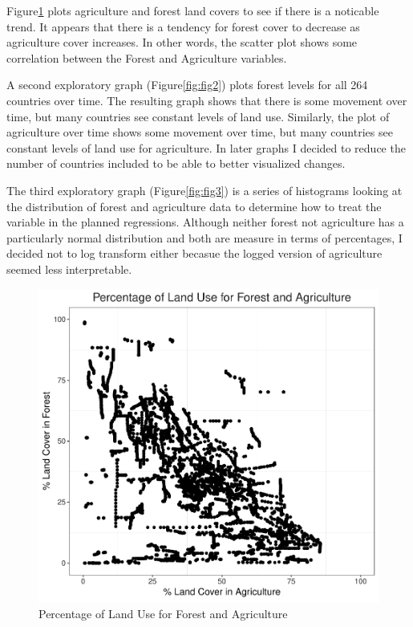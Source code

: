 \documentclass[12pt,]{article}
\begin{document}
Figure\ref{fig:fig1} plots agriculture and forest land covers to see if
there is a noticable trend. It appears that there is a tendency for
forest cover to decrease as agriculture cover increases. In other words,
the scatter plot shows some correlation between the Forest and
Agriculture variables.

A second exploratory graph (Figure\ref{fig:fig2}) plots forest levels
for all 264 countries over time. The resulting graph shows that there is
some movement over time, but many countries see constant levels of land
use. Similarly, the plot of agriculture over time shows some movement
over time, but many countries see constant levels of land use for
agriculture. In later graphs I decided to reduce the number of countries
included to be able to better visualized changes.

The third exploratory graph (Figure\ref{fig:fig3}) is a series of
histograms looking at the distribution of forest and agriculture data to
determine how to treat the variable in the planned regressions. Although
neither forest not agriculture has a particularly normal distribution
and both are measure in terms of percentages, I decided not to log
transform either becasue the logged version of agriculture seemed less
interpretable.

\begin{figure}
\centering
\includegraphics{Marx_ENV872_Project_files/figure-latex/fig1-1.pdf}
\caption{\label{fig:fig1}Percentage of Land Use for Forest and
Agriculture}
\end{figure}
\end{document}
